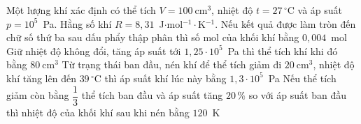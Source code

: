 	\begin{ex}%
		Một lượng khí xác định có thể tích $V=100~\text{cm}^3$, nhiệt độ $t=27\,^\circ\text{C}$ và áp suất $p=10^5$~Pa. Hằng số khí $R=8{,}31$~J$\cdot$mol$^{-1}\cdot$K$^{-1}$.
		\choiceTFt
		{\True Nếu kết quả được làm tròn đến chữ số thứ ba sau dấu phẩy thập phân thì số mol của khối khí bằng $0{,}004$~mol}
		{\True Giữ nhiệt độ không đổi, tăng áp suất tới $1{,}25\cdot 10^5$~Pa thì thể tích khí khi đó bằng $80~\text{cm}^3$}
		{\True Từ trạng thái ban đầu, nén khí để thể tích giảm đi $20~\text{cm}^3$, nhiệt độ khí tăng lên đến $39\,^\circ\text{C}$ thì áp suất khí lúc này bằng $1{,}3\cdot 10^5$~Pa}
		{\True Nếu thể tích giảm còn bằng $\dfrac{1}{3}$ thể tích ban đầu và áp suất tăng $20\,\%$ so với áp suất ban đầu thì nhiệt độ của khối khí sau khi nén bằng $120$~K}
	\end{ex}

